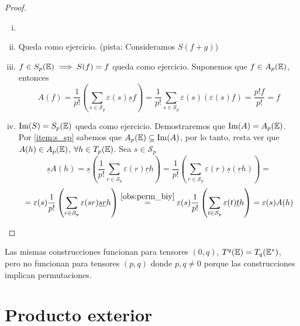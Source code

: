 \begin{proof}
    \begin{enumerate}[i)]
        \item[]
        \item Queda como ejercicio. (pista: Consideramos $S(f+g)$)
        \item $f \in S_p(\mathbb{E}) \implies S(f) = f$ queda como ejercicio.
        Suponemos que $f \in A_p(\mathbb{E})$, entonces
        \[
            A(f) = \frac{1}{p!} \left(\sum_{s \in \mathcal{S}_p} \varepsilon(s)\underline{s}f \right)
            = \frac{1}{p!}\sum_{s \in \mathcal{S}_p} \varepsilon(s) \left( \varepsilon(s)f \right) =
            \frac{p!f}{p!} = f
        \]
        \item $\operatorname{Im}(S)=S_p(\mathbb{E})$ queda como ejercicio. Demostraremos que $\operatorname{Im}(A)=A_p(\mathbb{E})$.
        Por \ref{item:s_sp} sabemos que $A_p(\mathbb{E}) \subseteq \operatorname{Im}(A)$, por lo tanto, resta
        ver que $A(h)\in A_p(\mathbb{E})$, $\forall h \in T_p(\mathbb{E})$. Sea $s \in \mathcal{S}_p$
        \[
            \underline{s}A(h) = \underline{s}\left( \frac{1}{p!}\sum_{r \in \mathcal{S}_p} \varepsilon(r)\underline{r}h
            \right) = \frac{1}{p!}\left(\sum_{r \in \mathcal{S}_p} \varepsilon(r)\underline{s}(\underline{r}h)\right) =
        \]
        \[
            = \varepsilon(s)\frac{1}{p!} \left( \sum_{r \in \mathcal{S}_p} \varepsilon(sr) \underline{sr}h \right)
            \stackrel{\ref{obs:perm_biy}}{=} \varepsilon(s)\frac{1}{p!} \left( \sum_{t \in \mathcal{S}_p} \varepsilon(t)
            \underline{t}h \right) = \varepsilon(s)A(h)
        \]
    \end{enumerate}
\end{proof}
\begin{obs}
    Las mismas construcciones funcionan para tensores $(0,q)$, $T^q(\mathbb{E}) = T_q(\mathbb{E}^*)$, pero no funcionan para
    tensores $(p,q)$ donde $p,q \neq 0$ porque las construcciones implican permutaciones.
\end{obs}


\section{Producto exterior}

